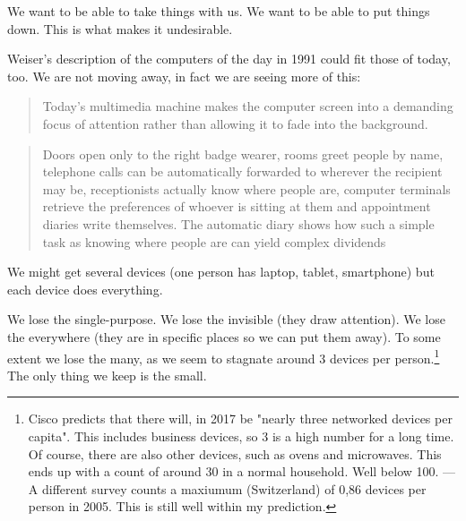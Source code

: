 We want to be able to take things with us. We want to be able to put things down. This is what makes it undesirable.

Weiser's description of the computers of the day in 1991 could fit those of today, too. We are not moving away, in fact we are
seeing more of this:

\begin{quote}
    Today's multimedia machine makes the computer screen into a demanding focus of attention rather than allowing it to fade
    into the background.\cite{weiser91}
\end{quote}

\begin{quote}
    Doors open only to the right badge wearer, rooms greet people by name, telephone calls can be automatically forwarded to wherever the recipient may be, receptionists actually know where people are, computer terminals retrieve the preferences of whoever is sitting at them and appointment diaries write themselves. The automatic diary shows how such a simple task as knowing where people are can yield complex dividends\cite{weiser91}
\end{quote}

We might get several devices (one person has laptop, tablet, smartphone) but each device does everything.

We lose the single-purpose. We lose the invisible (they draw attention). We lose the everywhere (they are in specific places
so we can put them away). To some extent we lose the many, as we seem to stagnate around 3 devices per person.\footnote{Cisco
predicts that there will, in 2017 be "nearly three networked devices per capita". This includes business devices, so 3 is a
high number for a long time.\cite{cisco} Of course, there are also other devices, such as ovens and microwaves. This ends up
with a count of around 30 in a normal household. Well below 100. --- A different survey counts a maxiumum (Switzerland) of
0,86 devices per person in 2005. This is still well within my prediction.\cite{nationmaster}} The only thing we keep is the small.